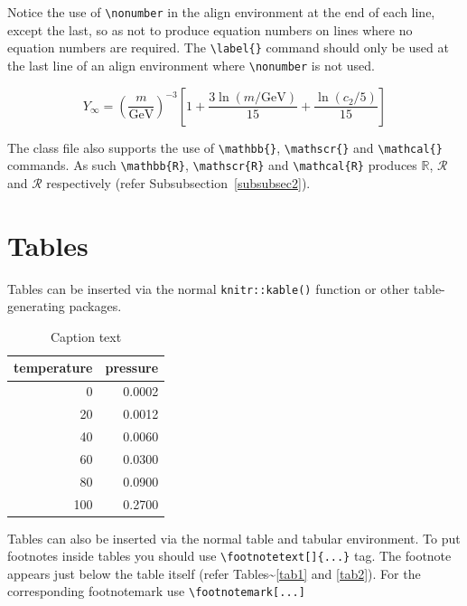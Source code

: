 \documentclass[sn-basic,pdflatex]{sn-jnl}
\theoremstyle{remark}
\theoremstyle{definition}
\begin{document}
Notice the use of \texttt{\textbackslash{}nonumber} in the align
environment at the end of each line, except the last, so as not to
produce equation numbers on lines where no equation numbers are
required. The \texttt{\textbackslash{}label\{\}} command should only be
used at the last line of an align environment where
\texttt{\textbackslash{}nonumber} is not used.

\begin{equation}
Y_\infty = \left( \frac{m}{\textrm{GeV}} \right)^{-3}
    \left[ 1 + \frac{3 \ln(m/\textrm{GeV})}{15}
    + \frac{\ln(c_2/5)}{15} \right]
\end{equation}

The class file also supports the use of
\texttt{\textbackslash{}mathbb\{\}},
\texttt{\textbackslash{}mathscr\{\}} and
\texttt{\textbackslash{}mathcal\{\}} commands. As such
\texttt{\textbackslash{}mathbb\{R\}},
\texttt{\textbackslash{}mathscr\{R\}} and
\texttt{\textbackslash{}mathcal\{R\}} produces \(\mathbb{R}\),
\(\mathscr{R}\) and \(\mathcal{R}\) respectively (refer
Subsubsection~\ref{subsubsec2}).

\section{Tables}\label{sec7}

Tables can be inserted via the normal \texttt{knitr::kable()} function
or other table-generating packages.

\begin{table}

\caption{\label{tab:tab1}Caption text}
\centering
\begin{tabular}[t]{r|r}
\hline
temperature & pressure\\
\hline
0 & 0.0002\\
\hline
20 & 0.0012\\
\hline
40 & 0.0060\\
\hline
60 & 0.0300\\
\hline
80 & 0.0900\\
\hline
100 & 0.2700\\
\hline
\end{tabular}
\end{table}

Tables can also be inserted via the normal table and tabular
environment. To put footnotes inside tables you should use
\texttt{\textbackslash{}footnotetext{[}{]}\{...\}} tag. The footnote
appears just below the table itself (refer
Tables\textasciitilde{}\ref{tab1} and \ref{tab2}). For the corresponding
footnotemark use \texttt{\textbackslash{}footnotemark{[}...{]}}
\end{document}
